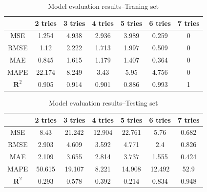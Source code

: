 \documentclass{mcmthesis}
\begin{document}
\begin{itemize}
\begin{table}[H]  %
    \centering        %
    \caption{Model evaluation results--Traning set}  %
    \vspace{0.2cm}
    \label{tab8}                       %
    \renewcommand\arraystretch{1.2}
    \begin{tabular}{|c|c|c|c|c|c|c|}  %
    \hline                    %
    ~ & 2 tries & 3 tries & 4 tries & 5 tries & 6 tries & 7 tries \\ \hline
    MSE & 1.254 & 4.938 & 2.936 & 3.989 & 0.259 & 0 \\ \hline
    RMSE &  1.12 & 2.222 &1.713 & 1.997 & 0.509 & 0 \\ \hline
    MAE	&   0.845 & 1.615 & 1.179 & 1.407 & 0.364 & 0 \\ \hline
    MAPE &  22.174 & 8.249 & 3.43 & 5.95 & 4.756 & 0 \\ \hline
    $\boldsymbol{R}^{2}$ & 0.905 & 0.914 & 0.901 & 0.886 & 0.993 & 1\\ \hline
    \end{tabular}
\end{table}

\begin{table}[H]  %
    \centering        %
    \caption{Model evaluation results--Testing set}  %
    \vspace{0.2cm}
    \label{tab8}                       %
    \renewcommand\arraystretch{1.2}
    \begin{tabular}{|c|c|c|c|c|c|c|}  %
    \hline                    %
    ~ & 2 tries & 3 tries & 4 tries & 5 tries & 6 tries & 7 tries \\ \hline
    MSE &   8.43 & 21.242 & 12.904 & 22.761 & 5.76 & 0.682\\ \hline
    RMSE &  2.903 & 4.609 & 3.592 & 4.771 & 2.4 & 0.826\\ \hline
    MAE	&  2.109 & 3.655 & 2.814 & 3.737 & 1.555 & 0.424 \\ \hline
    MAPE &  50.615 & 19.107 & 8.221 & 14.908 & 12.492 & 52.9 \\ \hline
    $\boldsymbol{R}^{2}$ & 0.293 & 0.578 & 0.392 & 0.214 & 0.834 & 0.948\\ \hline
    \end{tabular}
\end{table}


\end{itemize}
\end{document}
